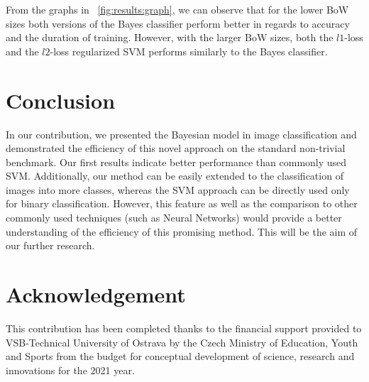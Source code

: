 \documentclass{aip-cp}
\newcommand{\figref}[1]{\figurename~\ref{#1}}
\begin{document}
From the graphs in \figref{fig:results:graph}, we can observe that for the lower BoW sizes both versions of the Bayes classifier perform better in regards to accuracy and the duration of training. However, with the larger BoW sizes, both the $l1$-loss and the $l2$-loss regularized SVM performs similarly to the Bayes classifier.

\section{Conclusion}
In our contribution, we presented the Bayesian model in image classification and demonstrated the efficiency of this novel approach on the standard non-trivial benchmark. Our first results indicate better performance than commonly used SVM. Additionally, our method can be easily extended to the classification of images into more classes, whereas the SVM approach can be directly used only for binary classification. However, this feature as well as the comparison to other commonly used techniques (such as Neural Networks) would provide a better understanding of the efficiency of this promising method. This will be the aim of our further research.

\section{Acknowledgement}
This contribution has been completed thanks to the financial support provided to VSB-Technical University of Ostrava by the Czech Ministry of Education, Youth and Sports from the budget for conceptual development of science, research and innovations for the 2021 year.



\end{document}
